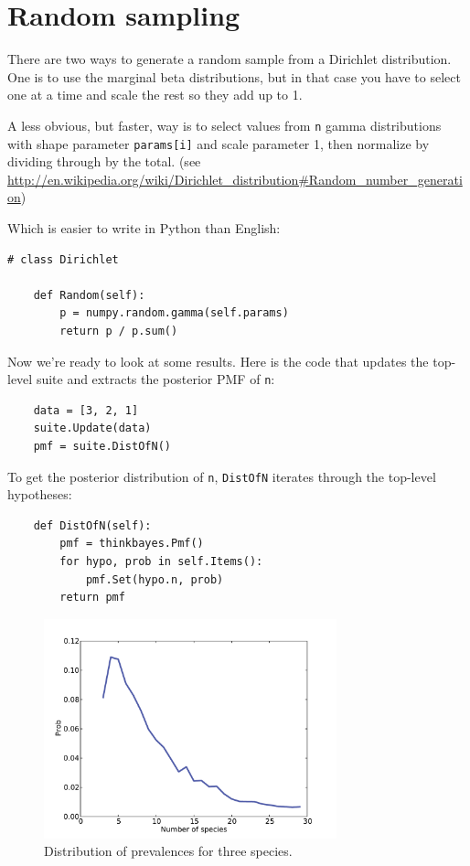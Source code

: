 \documentclass[12pt]{book}
\begin{document}
\section{Random sampling}

There are two ways to generate a random sample from a Dirichlet
distribution.  One is to use the marginal beta distributions,
but in that case you have to select one at a time and scale the rest
so they add up to 1.

A less obvious, but faster, way is to select values from {\tt n} gamma
distributions with shape parameter {\tt params[i]} and scale parameter
1, then normalize by dividing through by the total. (see
\url{http://en.wikipedia.org/wiki/Dirichlet_distribution#Random_number_generation})

Which is easier to write in Python than English:

\begin{verbatim}
# class Dirichlet

    def Random(self):
        p = numpy.random.gamma(self.params)
        return p / p.sum()
\end{verbatim}

Now we're ready to look at some results.  Here is the code that
updates the top-level suite and extracts the posterior PMF of {\tt n}:

\begin{verbatim}
    data = [3, 2, 1]
    suite.Update(data)
    pmf = suite.DistOfN()
\end{verbatim}

To get the posterior distribution of {\tt n}, {\tt DistOfN} iterates
through the top-level hypotheses:

\begin{verbatim}
    def DistOfN(self):
        pmf = thinkbayes.Pmf()
        for hypo, prob in self.Items():
            pmf.Set(hypo.n, prob)
        return pmf
\end{verbatim}

\begin{figure}
\centerline{\includegraphics[height=2.5in]{figs/species2.pdf}}
\caption{Distribution of prevalences for three species.}
\label{fig.species2}
\end{figure}
\end{document}
